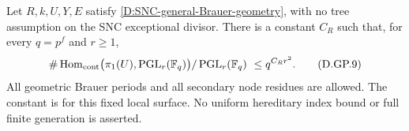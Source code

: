 \begin{theorem}
\label{D:SNC-general-projective-quadratic-count}
Let \(R,k,U,Y,E\) satisfy
\ref{D:SNC-general-Brauer-geometry}, with no tree
assumption on the SNC exceptional divisor.
There is a constant \(C_R\) such that, for every
\(q=p^f\) and \(r\geq1\),
\[
 \#\operatorname{Hom}_{\rm cont}
       \bigl(\pi_1(U),\operatorname{PGL}_r(\mathbb F_q)\bigr)
       /\operatorname{PGL}_r(\mathbb F_q)
                         \ \leq q^{C_R r^2}.           \tag{D.GP.9}
\]
All geometric Brauer periods and all secondary
node residues are allowed. The constant is for
this fixed local surface. No uniform hereditary
index bound or full finite generation is asserted.
\end{theorem}


